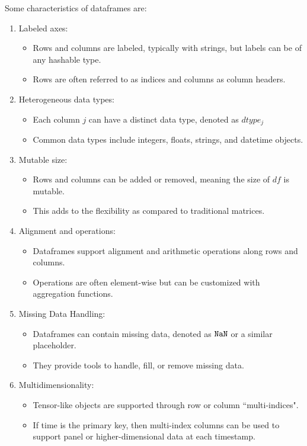 \documentclass[11pt, reqno]{amsart}
\theoremstyle{definition}
\theoremstyle{remark}
\newcommand{\NaN}{\textnormal{\texttt{NaN}}}
\begin{document}
Some characteristics of dataframes are:
\begin{enumerate}
  \item Labeled axes:
        \begin{itemize}
          \item Rows and columns are labeled, typically with strings, but labels can
                be of any hashable type.
          \item Rows are often referred to as indices and columns as column headers.
        \end{itemize}
  \item Heterogeneous data types:
        \begin{itemize}
          \item Each column $j$ can have a distinct data type, denoted as
                $dtype_j$
          \item Common data types include integers, floats, strings, and datetime
                objects.
        \end{itemize}
  \item Mutable size:
        \begin{itemize}
          \item Rows and columns can be added or removed, meaning the size of
                $df$ is mutable.
          \item This adds to the flexibility as compared to traditional matrices.
        \end{itemize}
  \item Alignment and operations:
        \begin{itemize}
          \item Dataframes support alignment and arithmetic operations along rows
                and columns.
          \item Operations are often element-wise but can be customized with
                aggregation functions.
        \end{itemize}
  \item Missing Data Handling:
        \begin{itemize}
          \item Dataframes can contain missing data, denoted as $\NaN$ or a
                similar placeholder.
          \item They provide tools to handle, fill, or remove missing data.
        \end{itemize}
  \item Multidimensionality:
        \begin{itemize}
          \item Tensor-like objects are supported through row or column
                ``multi-indices".
          \item If time is the primary key, then multi-index columns can be used
                to support panel or higher-dimensional data at each timestamp.
        \end{itemize}
\end{enumerate}
\end{document}
